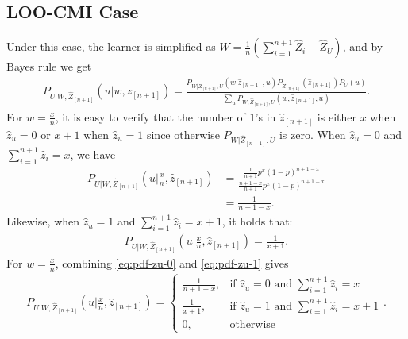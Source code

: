 \documentclass[onecolumn,romanappendices,10pt]{IEEEtran}
\begin{document}
	\subsection{LOO-CMI Case} \label{subapp:cal_LOO}
	\label{subsubsec: LOO-case}
	Under this case, the learner is simplified as $W = \frac{1}{n} (\sum_{i=1}^{n+1} \hat{Z}_i - \hat{Z}_U)$, and by Bayes rule we get
	\begin{equation}
		\begin{aligned}
			P_{U | W, \hat{Z}_{[n+1]}}(u | w, \hat{z}_{[n+1]}) = \frac{P_{W| \hat{Z}_{[n+1]}, U}(w| \hat{z}_{[n+1]}, u) P_{\hat{Z}_{[n+1]}}(\hat{z}_{[n+1]}) P_{U}(u)}{\sum_{u} P_{W, \hat{Z}_{[n+1]}, U}(w, \hat{z}_{[n+1]}, u)}.
		\end{aligned}
	\end{equation}
	For $w = \frac{x}{n}$, it is easy to verify that the number of $1$'s in $\hat{z}_{[n+1]}$ is either $x$ when $\hat{z}_u = 0$ or $x+1$ when $\hat{z}_u = 1$ since otherwise $P_{W| \hat{Z}_{[n+1]}, U}$ is zero. When $\hat{z}_u = 0$ and $\sum_{i = 1}^{n+1} \hat{z}_i = x$, we have
	\begin{equation} 
		\begin{aligned}
			P_{U | W, \hat{Z}_{[n+1]}}(u | \frac{x}{n}, \hat{z}_{[n+1]}) &= \frac{\frac{1}{n+1} p^x (1-p)^{n+1-x}}{\frac{n+1-x}{n+1} p^x (1-p)^{n+1-x}} \\
			&= \frac{1}{n+1-x}.
			\label{eq:pdf-zu-0}
		\end{aligned}
	\end{equation}
	Likewise, when $\hat{z}_u = 1$ and $\sum_{i = 1}^{n+1} \hat{z}_i = x+1$, it holds that:
	\begin{equation}
		\begin{aligned}
			P_{U | W, \hat{Z}_{[n+1]}}(u | \frac{x}{n}, \hat{z}_{[n+1]}) = \frac{1}{x+1}.
			\label{eq:pdf-zu-1}
		\end{aligned}
	\end{equation}
	For $w = \frac{x}{n}$, combining \eqref{eq:pdf-zu-0} and \eqref{eq:pdf-zu-1} gives
	\begin{equation}
		\begin{aligned}
			P_{U | W, \hat{Z}_{[n+1]}}(u | \frac{x}{n}, \hat{z}_{[n+1]}) = \begin{cases}
				\frac{1}{n+1-x}, & \text{if $\hat{z}_u = 0$ and $\sum_{i = 1}^{n+1} \hat{z}_i = x$} \\
				\frac{1}{x+1}, & \text{if $\hat{z}_u = 1$ and $\sum_{i = 1}^{n+1} \hat{z}_i = x+1$} \\
				0, & \text{otherwise}
			\end{cases}.
		\end{aligned}
	\end{equation}
\end{document}
